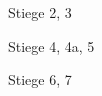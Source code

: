 \documentclass[a4paper]{article}
\begin{document}
\printVSLEventHeader{}{}
\begin{center}
\begin{vsltext}{3cm}{3.5cm}
    Stiege 2, 3

    \vspace{1cm}

    Stiege 4, 4a, 5

    \vspace{1cm}

    Stiege 6, 7

\end{vsltext}

\end{center}
\end{document}
